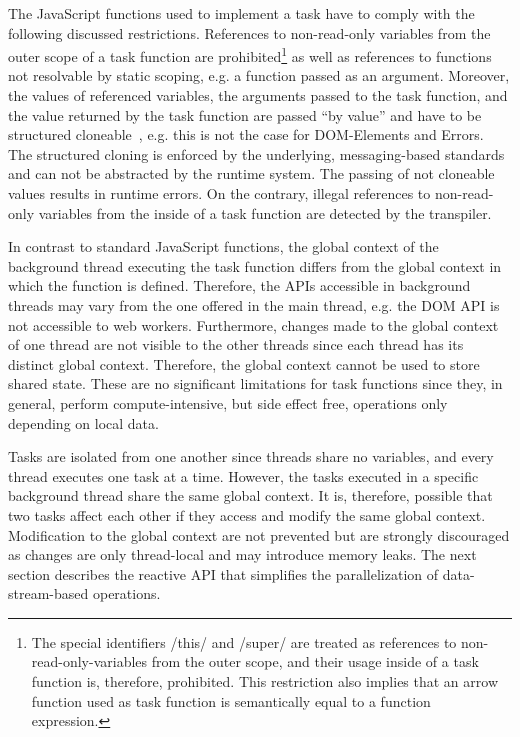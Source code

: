 The JavaScript functions used to implement a task have to comply with the following discussed restrictions. References to non-read-only variables from the outer scope of a task function are prohibited\footnote{The special identifiers \javascriptinline/this/ and \javascriptinline/super/ are treated as references to non-read-only-variables from the outer scope, and their usage inside of a task function is, therefore, prohibited. This restriction also implies that an arrow function used as task function is semantically equal to a function expression.} as well as references to functions not resolvable by static scoping, e.g. a function passed as an argument. Moreover, the values of referenced variables, the arguments passed to the task function, and the value returned by the task function are passed \enquote{by value} and have to be structured cloneable~\cite[Section 2.9.4]{WHATWG2016}, e.g. this is not the case for DOM-Elements and Errors. The structured cloning is enforced by the underlying, messaging-based standards and can not be abstracted by the runtime system. The passing of not cloneable values results in runtime errors. On the contrary, illegal references to non-read-only variables from the inside of a task function are detected by the transpiler.

In contrast to standard JavaScript functions, the global context of the background thread executing the task function differs from the global context in which the function is defined. Therefore, the APIs accessible in background threads may vary from the one offered in the main thread, e.g. the DOM API is not accessible to web workers. Furthermore, changes made to the global context of one thread are not visible to the other threads since each thread has its distinct global context. Therefore, the global context cannot be used to store shared state. These are no significant limitations for task functions since they, in general, perform compute-intensive, but side effect free, operations only depending on local data.

Tasks are isolated from one another since threads share no variables, and every thread executes one task at a time. However, the tasks executed in a specific background thread share the same global context. It is, therefore, possible that two tasks affect each other if they access and modify the same global context. Modification to the global context are not prevented but are strongly discouraged as changes are only thread-local and may introduce memory leaks. The next section describes the reactive API that simplifies the parallelization of data-stream-based operations.

